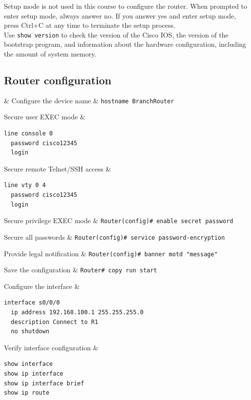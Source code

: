 \note Setup mode is not used in this course to configure the router. When prompted to enter setup mode, always answer no. If you answer yes and enter setup mode, press Ctrl+C at any time to terminate the setup process.\\

Use \verb|show version| to check the version of the Cisco IOS, the version of the bootstrap program, and information about the hardware configuration, including the amount of system memory.

\subsection{Router configuration}

 & \w
Configure the device name & \verb|hostname BranchRouter| \w

Secure user EXEC mode & 
\begin{minipage}{4in}
\begin{verbatim}
line console 0
  password cisco12345
  login
\end{verbatim} 
\end{minipage} \w

Secure remote Telnet/SSH access & 
\begin{minipage}{4in}
\begin{verbatim}
line vty 0 4
  password cisco12345
  login
\end{verbatim} 
\end{minipage} \w

Secure privilege EXEC mode & \verb|Router(config)# enable secret password|\w

Secure all passwords & \verb|Router(config)# service password-encryption|\w

Provide legal notification & \verb|Router(config)# banner motd "message"|\w

Save the configuration & \verb|Router# copy run start|\w

Configure the interface & 
\begin{minipage}{3in}
\begin{verbatim}
interface s0/0/0
  ip address 192.168.100.1 255.255.255.0
  description Connect to R1
  no shutdown
\end{verbatim}
\end{minipage}\w

Verify interface configuration & 
\begin{minipage}{3in}
\begin{verbatim}
show interface
show ip interface
show ip interface brief
show ip route
\end{verbatim}
\end{minipage}\w

